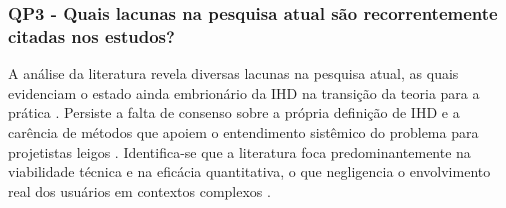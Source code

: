 \documentclass[
	12pt,				%
	oneside,			%
	a4paper,			%
	english,			%
	brazil				%
	]{abntex2ppgsi}
\begin{document}





\subsubsection{QP3 - Quais lacunas na pesquisa atual são recorrentemente citadas nos estudos?}

    A análise da literatura revela diversas lacunas na pesquisa atual, as quais evidenciam o estado ainda embrionário da IHD na transição da teoria para a prática \cite{Sailaja2021, Lee-Smith2020}. Persiste a falta de consenso sobre a própria definição de IHD e a carência de métodos que apoiem o entendimento sistêmico do problema para projetistas leigos \cite{Strey2019Human}. Identifica-se que a literatura foca predominantemente na viabilidade técnica e na eficácia quantitativa, o que negligencia o envolvimento real dos usuários em contextos complexos \cite{sailaja2021exploring}. 
\end{document}
